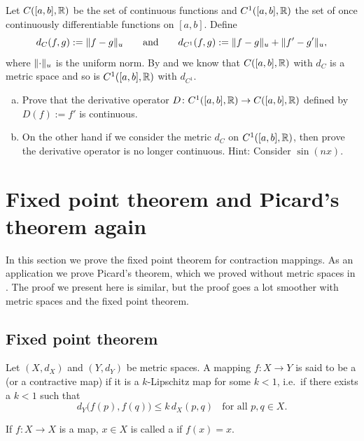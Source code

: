 \begin{samepage}
\begin{exercise}
Let $C([a,b],{\mathbb{R}})$ be the set of continuous functions and
$C^1([a,b],{\mathbb{R}})$ the set of once continuously differentiable
functions on $[a,b]$.
Define
\begin{equation*}
d_{C}(f,g) := \lVert {f-g} \rVert_u
\qquad \text{and} \qquad
d_{C^1}(f,g) := \lVert {f-g} \rVert_u + \lVert {f'-g'} \rVert_u,
\end{equation*}
where $\lVert {\cdot} \rVert_u$ is the uniform norm.
By  and  we know that
$C([a,b],{\mathbb{R}})$ with $d_C$ is a metric space and
so is
$C^1([a,b],{\mathbb{R}})$ with $d_{C^1}$.
\begin{enumerate}[a)]
\item
Prove that the derivative operator $D \colon 
C^1([a,b],{\mathbb{R}}) \to C([a,b],{\mathbb{R}})$ defined by
$D(f) := f'$ is continuous.
\item
On the other hand if we consider the metric $d_C$ on $C^1([a,b],{\mathbb{R}})$,
then prove the derivative operator is no longer continuous.  Hint: Consider
$\sin(n x)$.
\end{enumerate}
\end{exercise}
\end{samepage}


\sectionnewpage
\section{Fixed point theorem and Picard's theorem again}
\label{sec:metpicard}


In this section we prove the fixed point theorem for contraction
mappings.  As an application we prove Picard's theorem, which we proved
without metric spaces in .
The proof we present here is similar, but the proof goes a lot
smoother with metric spaces and the fixed point theorem.

\subsection{Fixed point theorem}

\begin{defn}
Let $(X,d_X)$ and $(Y,d_Y)$ be metric spaces.
A mapping
$f \colon X \to Y$ is said to be a \emph{}
(or a contractive map) if it is
a $k$-Lipschitz map for some $k < 1$, i.e.\ if there exists a $k < 1$ such that
\begin{equation*}
d_Y\bigl(f(p),f(q)\bigr) \leq k\, d_X(p,q)
\ \ \ \ \text{for all } p,q \in X.
\end{equation*}

\medskip

If $f \colon X \to X$ is a map, $x \in X$ is called a
\emph{}
if $f(x)=x$.
\end{defn}

